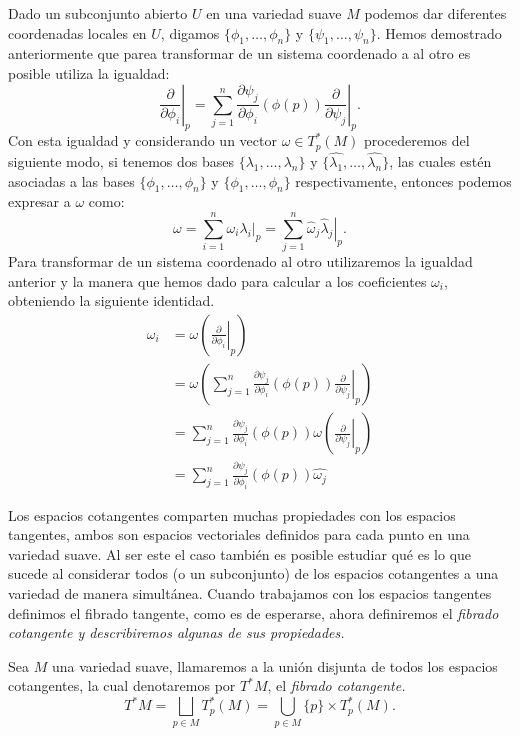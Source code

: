 Dado un subconjunto abierto $U$ en una variedad suave $M$ podemos dar diferentes coordenadas locales en $U$, digamos $\{\phi_1,\ldots,\phi_n\}$ y $\{\psi_1,\ldots,\psi_n\}$. Hemos demostrado anteriormente que parea transformar de un sistema coordenado a al otro es posible utiliza la igualdad:
\[
	\left. \frac{\partial}{\partial \phi_i} \right|_p =
	\sum_{j=1}^{n} \left. \frac{\partial \psi_j}{\partial \phi_i} (\phi(p))
	\frac{\partial}{\partial \psi_j} \right|_{p}.
\]
Con esta igualdad y considerando un vector $\omega \in T_{p}^{*}(M)$ procederemos del siguiente modo, si tenemos dos bases $\{\lambda_1,\ldots,\lambda_n\}$ y $\{\hat{\lambda_1},\ldots,\hat{\lambda_n}\}$, las cuales estén asociadas a las bases $\{\phi_1, \ldots, \phi_n\}$ y $\{\phi_1, \ldots, \phi_n\}$ respectivamente, entonces podemos expresar a $\omega$ como:
\[
	\omega = \sum_{i=1}^{n} \left. \omega_i \lambda_i \right|_p
	= \sum_{j=1}^{n} \left. \hat{\omega}_j \hat{\lambda}_j \right|_p.
\]
Para transformar de un sistema coordenado al otro utilizaremos la igualdad anterior y la manera que hemos dado para calcular a los coeficientes $\omega_i$, obteniendo la siguiente identidad.
\begin{align*}
	\omega_i & = \omega
	\left(
	\left. \frac{\partial}{\partial \phi_i} \right|_{p}
	\right)                                                                       \\
	         & = \omega
	\left(
	\sum_{j=1}^{n} \frac{\partial \psi_j}{\partial \phi_i} (\phi(p))
	\left. \frac{\partial}{\partial \psi_j}\right|_{p} \right)                    \\
	         & = \sum_{j=1}^{n} \frac{\partial \psi_j}{\partial \phi_i} (\phi(p))
	\omega \left( \left. \frac{\partial}{\partial \psi_j}\right|_{p} \right)      \\
	         & = \sum_{j=1}^{n} \frac{\partial \psi_j}{\partial \phi_i} (\phi(p))
	\hat{\omega_j}
\end{align*}

Los espacios cotangentes comparten muchas propiedades con los espacios tangentes, ambos son espacios vectoriales definidos para cada punto en una variedad suave. Al ser este el caso también es posible estudiar qué es lo que sucede al considerar todos (o un subconjunto) de los espacios cotangentes a una variedad de manera simultánea. Cuando trabajamos con los espacios tangentes definimos el fibrado tangente, como es de esperarse, ahora definiremos el \it{fibrado cotangente} y describiremos algunas de sus propiedades.

\begin{definition}
	Sea $M$ una variedad suave, llamaremos a la unión disjunta de todos los espacios cotangentes, la cual denotaremos por $T^{*}M$, el \it{fibrado cotangente}.
	\[ T^{*}M = \bigsqcup_{p \in M} T_{p}^{*}(M) = \bigcup_{p \in M} \{p\} \times T_{p}^{*}(M). \]
\end{definition}

